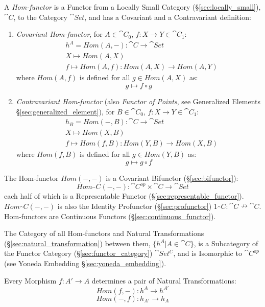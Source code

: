 A \emph{Hom-functor} is a Functor from a Locally Small Category
(\S\ref{sec:locally_small}), $\cat{C}$, to the Category $\cat{Set}$,
and has a Covariant and a Contravariant definition:

\begin{enumerate}
  \item \emph{Covariant Hom-functor}, for $A \in \cat{C}_0$, $f : X
    \rightarrow Y \in \cat{C}_1$:
\[
\begin{split}
  & h^A = Hom(A,-) : \cat{C} \rightarrow \cat{Set} \\
  & X \mapsto Hom(A,X) \\
  & f \mapsto Hom(A,f) : Hom(A,X) \rightarrow Hom(A,Y)
\end{split}
\]
  where $Hom(A,f)$ is defined for all $g \in Hom(A,X)$ as:
\[
  g \mapsto f \circ g
\]

  \item \emph{Contravariant Hom-functor} (also \emph{Functor of
    Points}, see Generalized Elements
    \S\ref{sec:generalized_element}), for $B \in \cat{C}_0$, $f : X
    \rightarrow Y \in \cat{C}_1$:
\[
\begin{split}
  & h_B = Hom(-,B) : \cat{C} \rightarrow \cat{Set} \\
  & X \mapsto Hom(X,B) \\
  & f \mapsto Hom(f,B) : Hom(Y,B) \rightarrow Hom(X,B)
\end{split}
\]
  where $Hom(f,B)$ is defined for all $g \in Hom(Y,B)$ as:
\[
  g \mapsto g \circ f
\]
\end{enumerate}

The Hom-functor $Hom(-,-)$ is a Covariant Bifunctor
(\S\ref{sec:bifunctor}):
\[
  Hom_\cat{C}(-,-):
    \cat{C}^{op} \times \cat{C} \rightarrow \cat{Set}
\]
each half of which is a Representable Functor
(\S\ref{sec:representable_functor}). $Hom_\cat{C}(-,-)$ is also the
Identity Profunctor (\S\ref{sec:profunctor}) $1_\cat{C} :
\cat{C} \nrightarrow \cat{C}$. Hom-functors are Continuous
Functors (\S\ref{sec:continuous_functor}).

The Category of all Hom-functors and Natural Transformations
(\S\ref{sec:natural_transformation}) between them, $\{ h^A | A \in
\cat{C} \}$, is a Subcategory of the Functor Category
(\S\ref{sec:functor_category}) $\cat{Set^C}$, and is Isomorphic to
$\cat{C^{op}}$ (see Yoneda Embedding \S\ref{sec:yoneda_embedding}).

Every Morphism $f : A' \rightarrow A$ determines a pair of Natural
Transformations:
\[
  Hom(f,-) : h^A \rightarrow h^{A'}
\]\[
  Hom(-,f) : h_{A'} \rightarrow h_A
\]

